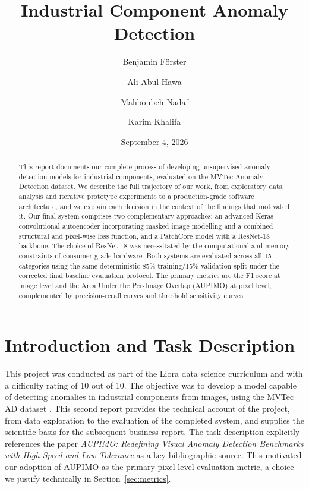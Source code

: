 \documentclass[11pt, a4paper]{article}
\title{
    \vspace{-1cm}
    {\LARGE Industrial Component Anomaly Detection}\\[0.5em]
}
\author{
    Benjamin F{\"o}rster \and
    Ali Abul Hawa \and
    Mahboubeh Nadaf \and
    Karim Khalifa
}
\date{September 4, 2026}
\begin{document}
\maketitle
\thispagestyle{fancy}

\begin{abstract}
    This report documents our complete process of developing unsupervised anomaly detection models for industrial components, evaluated on the MVTec Anomaly Detection dataset. We describe the full trajectory of our work, from exploratory data analysis and iterative prototype experiments to a production-grade software architecture, and we explain each decision in the context of the findings that motivated it. Our final system comprises two complementary approaches: an advanced Keras convolutional autoencoder incorporating masked image modelling and a combined structural and pixel-wise loss function, and a PatchCore model with a ResNet-18 backbone. The choice of ResNet-18 was necessitated by the computational and memory constraints of consumer-grade hardware. Both systems are evaluated across all 15 categories using the same deterministic 85\% training/15\% validation split under the corrected final baseline evaluation protocol. The primary metrics are the F1 score at image level and the Area Under the Per-Image Overlap (AUPIMO) at pixel level, complemented by precision-recall curves and threshold sensitivity curves.
\end{abstract}


\section{Introduction and Task Description}
\label{sec:introduction}

This project was conducted as part of the Liora data science curriculum and with a difficulty rating of 10 out of 10. The objective was to develop a model capable of detecting anomalies in industrial components from images, using the MVTec AD dataset \cite{bergmann2019mvtec, bergmann2021mvtec}. This second report provides the technical account of the project, from data exploration to the evaluation of the completed system, and supplies the scientific basis for the subsequent business report. The task description explicitly references the paper \textit{AUPIMO: Redefining Visual Anomaly Detection Benchmarks with High Speed and Low Tolerance} \cite{bertoldo2024aupimo} as a key bibliographic source. This motivated our adoption of AUPIMO as the primary pixel-level evaluation metric, a choice we justify technically in Section~\ref{sec:metrics}.
\end{document}
